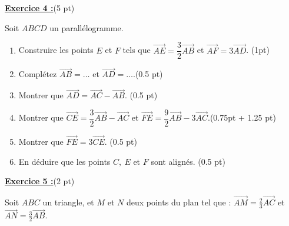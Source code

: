 \documentclass[12pt,a4paper]{article}
\begin{document}
\underline{\large\textbf{Exercice 4 :}}(5 pt)

Soit $ABCD$ un parallélogramme. 
\begin{enumerate}
	\item Construire les points $E$ et $F$ tels que $\overrightarrow{AE} = \dfrac{3}{2}\overrightarrow{AB}$ et $\overrightarrow{AF} = 3\overrightarrow{AD}$. (1pt)
	\item Complétez $\overrightarrow{AB} = \dots$ et $\overrightarrow{AD} = \dots$.(0.5 pt)
	\item Montrer que $\overrightarrow{AD} = \overrightarrow{AC} - \overrightarrow{AB}$. (0.5 pt)
	\item Montrer que $\overrightarrow{CE} = \dfrac{3}{2}\overrightarrow{AB} - \overrightarrow{AC}$ et $\overrightarrow{FE} = \dfrac{9}{2}\overrightarrow{AB} - 3\overrightarrow{AC}$.(0.75pt + 1.25 pt)
	\item Montrer que $\overrightarrow{FE} = 3\overrightarrow{CE}$. (0.5 pt)
	\item En déduire que les points $C,\ E$ et $F$ sont alignés. (0.5 pt)
\end{enumerate}


\underline{\large\textbf{Exercice 5 :}}(2 pt)

Soit $ABC$ un triangle, et $M$ et $N$ deux points du plan tel que : $\overrightarrow{AM} = \displaystyle\frac{2}{3}\overrightarrow{AC}$ et $\overrightarrow{AN} = \displaystyle\frac{3}{2}\overrightarrow{AB}$.
\end{document}
